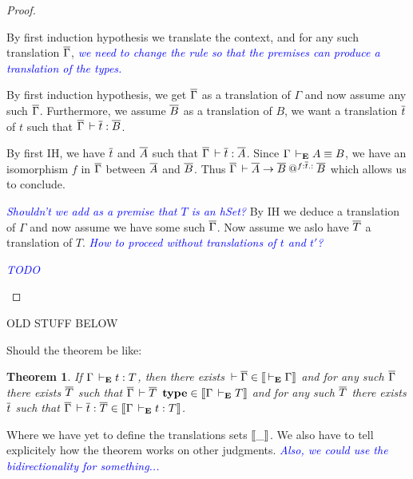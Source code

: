 \documentclass{amsart}
\newcommand\meta[1]{\noindent\textcolor{blue}{\emph{#1}}}
\newtheorem{theorem}{Theorem}[section]
\begin{document}
\begin{proof}
\begin{caselist}
    \nextcase
    \begin{mathpar}
    \end{mathpar}
    By first induction hypothesis we translate the context, and for any such
    translation $\barG$, \meta{we need to change the rule so that the premises
    can produce a translation of the types.}

    \nextcase
    \begin{mathpar}
    \end{mathpar}
    By first induction hypothesis, we get $\barG$ as a translation of $\Gamma$
    and now assume any such $\barG$. Furthermore, we assume $\barB$ as a
    translation of $B$, we want a translation $\bart$ of $t$ such that
    $\barG \der \bart : \barB$.

    By first IH, we have $\bart$ and $\barA$ such that
    $\barG \der \bart : \barA$. Since $\Gamma \dere A \equiv B$, we have
    an isomorphism $f$ in $\barG$ between $\barA$ and $\barB$.
    Thus $\barG \der \app{\barA \to \barB}{f}{\bart} : \barB$ which allows us
    to conclude.

    \nextcase
    \begin{mathpar}
    \end{mathpar}
    \meta{Shouldn't we add as a premise that $T$ is an hSet?}
    By IH we deduce a translation of $\Gamma$ and now assume we have some such
    $\barG$. Now assume we aslo have $\barT$ a translation of $T$.
    \meta{How to proceed without translations of $t$ and $t'$?}

    \nextcase
    \begin{mathpar}
    \end{mathpar}
    \meta{TODO}
  \end{caselist}
\end{proof}

\newpage
\hrulefill
OLD STUFF BELOW

Should the theorem be like:

\begin{theorem}
  If $\Gamma \dere t : T$, then there exists
  $\der \barG \in \den{\dere \Gamma}$ and for any such $\barG$ there exists
  $\barT$ such that $\barG \der \barT\ \type \in \den{\Gamma \dere T}$
  and for any such $\barT$ there exists $\bart$ such that
  $\barG \der \bart : \barT \in \den{\Gamma \dere t : T}$.
\end{theorem}
%
Where we have yet to define the translations sets $\den{\_}$.
We also have to tell explicitely how the theorem works on other judgments.
\meta{Also, we could use the bidirectionality for something...}
\end{document}
